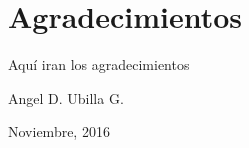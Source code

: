 \newpage

\section*{Agradecimientos}

Aquí iran los agradecimientos

	
\begin{flushright}
Angel D. Ubilla G.
\end{flushright}
\begin{flushright}
Noviembre, 2016
\end{flushright}
